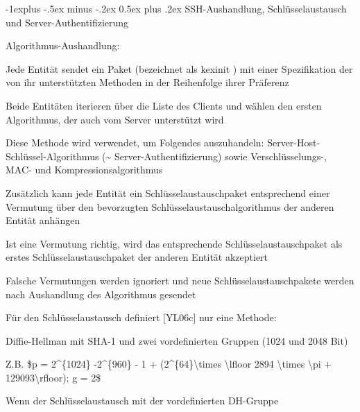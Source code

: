 \documentclass[a4paper]{article}
\makeatletter
\renewcommand{\subsection}{\@startsection{subsection}{2}{0mm}%
 {-1explus -.5ex minus -.2ex}%
 {0.5ex plus .2ex}%
 {\normalfont\normalsize\bfseries}}
\makeatother
\begin{document}
\begin{multicols}{3}
\begin{itemize*}
            \subsection{SSH-Aushandlung, Schlüsselaustausch und
                  Server-Authentifizierung}
            \begin{itemize*}
                  \item       Algorithmus-Aushandlung:
                  \begin{itemize*}
                        \item Jede Entität sendet ein Paket (bezeichnet als kexinit ) mit einer Spezifikation der von ihr unterstützten Methoden in der Reihenfolge ihrer Präferenz
                        \item Beide Entitäten iterieren über die Liste des Clients und wählen den ersten Algorithmus, der auch vom Server unterstützt wird
                        \item Diese Methode wird verwendet, um Folgendes auszuhandeln: Server-Host-Schlüssel-Algorithmus (\textasciitilde{} Server-Authentifizierung) sowie Verschlüsselungs-, MAC- und Kompressionsalgorithmus
                        \item Zusätzlich kann jede Entität ein Schlüsselaustauschpaket entsprechend einer Vermutung über den bevorzugten Schlüsselaustauschalgorithmus der anderen Entität anhängen
                        \item Ist eine Vermutung richtig, wird das entsprechende Schlüsselaustauschpaket als erstes Schlüsselaustauschpaket der anderen Entität akzeptiert
                        \item Falsche Vermutungen werden ignoriert und neue Schlüsselaustauschpakete werden nach Aushandlung des Algorithmus gesendet
                  \end{itemize*}
                  \item       Für den Schlüsselaustausch definiert {[}YL06c{]} nur eine Methode:
                  \begin{itemize*}
                        \item Diffie-Hellman mit SHA-1 und zwei vordefinierten Gruppen (1024 und 2048 Bit)
                        \item Z.B. \$p = 2\^{}\{1024\} -2\^{}\{960\} - 1 + (2\^{}\{64\}\textbackslash times \textbackslash lfloor 2894 \textbackslash times \textbackslash pi + 129093\textbackslash rfloor); g = 2\$
                  \end{itemize*}
                  \item       Wenn der Schlüsselaustausch mit der vordefinierten DH-Gruppe

\end{itemize*}
\end{itemize*}
\end{multicols}
\end{document}
